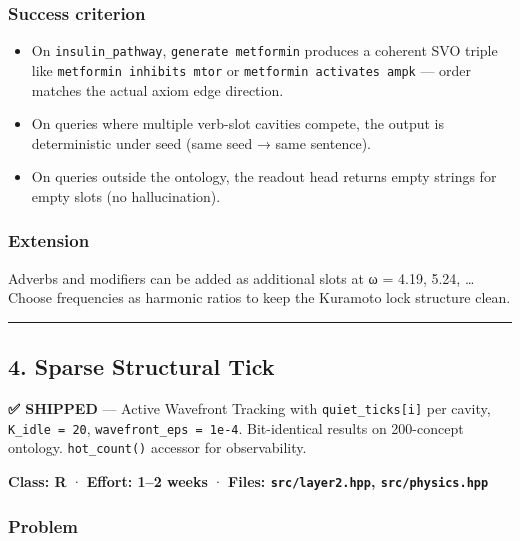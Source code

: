 \documentclass[
  11pt,
  a4paper,
]{article}
\providecommand{\tightlist}{%
  \setlength{\itemsep}{0pt}\setlength{\parskip}{0pt}}
\begin{document}
\subsubsection{Success criterion}\label{success-criterion-2}

\begin{itemize}
\tightlist
\item
  On \texttt{insulin\_pathway}, \texttt{generate\ metformin} produces a
  coherent SVO triple like \texttt{metformin\ inhibits\ mtor} or
  \texttt{metformin\ activates\ ampk} --- order matches the actual axiom
  edge direction.
\item
  On queries where multiple verb-slot cavities compete, the output is
  deterministic under seed (same seed → same sentence).
\item
  On queries outside the ontology, the readout head returns empty
  strings for empty slots (no hallucination).
\end{itemize}

\subsubsection{Extension}\label{extension}

Adverbs and modifiers can be added as additional slots at ω = 4.19,
5.24, \ldots{} Choose frequencies as harmonic ratios to keep the
Kuramoto lock structure clean.

\begin{center}\rule{0.5\linewidth}{0.5pt}\end{center}

\subsection{4. Sparse Structural Tick}\label{sparse-structural-tick}

\textbf{✅ SHIPPED} --- Active Wavefront Tracking with
\texttt{quiet\_ticks{[}i{]}} per cavity, \texttt{K\_idle\ =\ 20},
\texttt{wavefront\_eps\ =\ 1e-4}. Bit-identical results on 200-concept
ontology. \texttt{hot\_count()} accessor for observability.

\textbf{Class: R} · \textbf{Effort: 1--2 weeks} · \textbf{Files:
\texttt{src/layer2.hpp}, \texttt{src/physics.hpp}}

\subsubsection{Problem}\label{problem-3}
\end{document}
